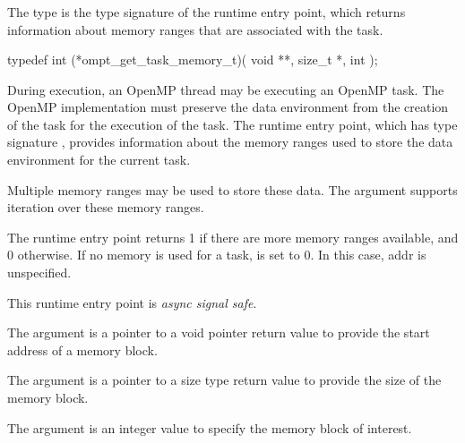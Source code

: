 \subsubsection{}
\label{sec:ompt_get_task_memory_t}
\label{sec:ompt_get_task_memory}

\summary
The  type is the type signature of the 
 runtime entry point, which returns information 
about memory ranges that are associated with the task.

\format
\begin{ccppspecific}
\begin{omptInquiry}
typedef int (*ompt_get_task_memory_t)(
  void **,
  size_t *,
  int 
);
\end{omptInquiry}
\end{ccppspecific}

\descr
During execution, an OpenMP thread may be executing an OpenMP task. The 
OpenMP implementation must preserve the data environment from the creation 
of the task for the execution of the task. The  
runtime entry point, which has type signature ,
provides information about the  memory ranges used to store the data 
environment for the current task.

Multiple memory ranges may be used to store these data. The  
argument supports iteration over these memory ranges.

The  runtime entry point returns 1 if there 
are more memory ranges available, and 0 otherwise. If no memory is used 
for a task,  is set to 0. In this case, addr is unspecified.

This runtime entry point is \emph{async signal safe}.

\argdesc
The  argument is a pointer to a void pointer return value
to provide the start address of a memory block.  

The  argument is a pointer to a size type return
value to provide the size of the memory block.

The  argument is an integer value to specify the
memory block of interest.



\subsubsection{}
\label{sec:ompt_get_target_info_t}
\label{sec:ompt_get_target_info}

